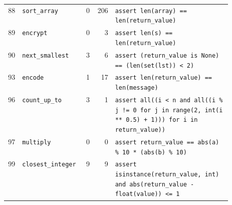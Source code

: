 \begin{footnotesize}
\begin{longtable}{@{}r l r r p{0.52\linewidth}@{}}
88 & \texttt{sort\_array} & 0 & 206 & \texttt{assert \allowbreak{}len(\allowbreak{}array)\allowbreak{} \allowbreak{}=\allowbreak{}=\allowbreak{} \allowbreak{}len(\allowbreak{}return\_value)\allowbreak{}} \\
89 & \texttt{encrypt} & 0 & 3 & \texttt{assert \allowbreak{}len(\allowbreak{}s)\allowbreak{} \allowbreak{}=\allowbreak{}=\allowbreak{} \allowbreak{}len(\allowbreak{}return\_value)\allowbreak{}} \\
90 & \texttt{next\_smallest} & 3 & 6 & \texttt{assert \allowbreak{}(\allowbreak{}return\_value \allowbreak{}is \allowbreak{}None)\allowbreak{} \allowbreak{}=\allowbreak{}=\allowbreak{} \allowbreak{}(\allowbreak{}len(\allowbreak{}set(\allowbreak{}lst)\allowbreak{})\allowbreak{} \allowbreak{}<\allowbreak{} \allowbreak{}2)\allowbreak{}} \\
93 & \texttt{encode} & 1 & 17 & \texttt{assert \allowbreak{}len(\allowbreak{}return\_value)\allowbreak{} \allowbreak{}=\allowbreak{}=\allowbreak{} \allowbreak{}len(\allowbreak{}message)\allowbreak{}} \\
96 & \texttt{count\_up\_to} & 3 & 1 & \texttt{assert \allowbreak{}all(\allowbreak{}(\allowbreak{}i \allowbreak{}<\allowbreak{} \allowbreak{}n \allowbreak{}and \allowbreak{}all(\allowbreak{}(\allowbreak{}i \allowbreak{}\% \allowbreak{}j \allowbreak{}!=\allowbreak{} \allowbreak{}0 \allowbreak{}for \allowbreak{}j \allowbreak{}in \allowbreak{}range(\allowbreak{}2,\allowbreak{} \allowbreak{}int(\allowbreak{}i \allowbreak{}*\allowbreak{}*\allowbreak{} \allowbreak{}0.\allowbreak{}5)\allowbreak{} \allowbreak{}+\allowbreak{} \allowbreak{}1)\allowbreak{})\allowbreak{})\allowbreak{} \allowbreak{}for \allowbreak{}i \allowbreak{}in \allowbreak{}return\_value)\allowbreak{})\allowbreak{}} \\
97 & \texttt{multiply} & 0 & 0 & \texttt{assert \allowbreak{}return\_value \allowbreak{}=\allowbreak{}=\allowbreak{} \allowbreak{}abs(\allowbreak{}a)\allowbreak{} \allowbreak{}\% \allowbreak{}10 \allowbreak{}*\allowbreak{} \allowbreak{}(\allowbreak{}abs(\allowbreak{}b)\allowbreak{} \allowbreak{}\% \allowbreak{}10)\allowbreak{}} \\
99 & \texttt{closest\_integer} & 9 & 9 & \texttt{assert \allowbreak{}isinstance(\allowbreak{}return\_value,\allowbreak{} \allowbreak{}int)\allowbreak{} \allowbreak{}and \allowbreak{}abs(\allowbreak{}return\_value \allowbreak{}-\allowbreak{} \allowbreak{}float(\allowbreak{}value)\allowbreak{})\allowbreak{} \allowbreak{}<\allowbreak{}=\allowbreak{} \allowbreak{}1} \\

\end{longtable}
\end{footnotesize}
